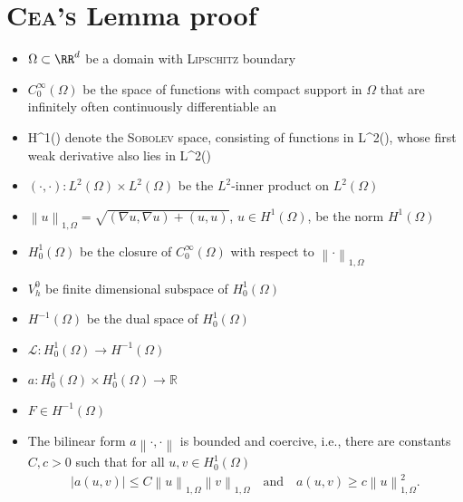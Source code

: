 \section{\textsc{Cea's} Lemma proof}
%
\newtheorem{theorem}{Theorem}
%

%
\begin{itemize}
    \item \(\Omega \subset \RR^d\) be a domain with \textsc{Lipschitz} boundary
    \item \(C^\infty_0(\Omega)\) be the space of functions with compact support in \(\Omega\) that are infinitely often continuously differentiable an
    \item H^1(\Omega) denote the \textsc{Sobolev} space, consisting of functions in L^2(\Omega), whose first weak derivative also lies in L^2(\Omega)
    \item \(\left(\cdot, \cdot \right): L^2(\Omega) \times L^2(\Omega)\) be the \(L^2\)-inner product on \(L^2(\Omega)\)
    \item \(\left\|u\right\|_{1,\Omega} = \sqrt{\left(\nabla u, \nabla u\right) + \left(u, u\right)}\), \(u \in H^1(\Omega)\), be the norm \(H^1(\Omega)\)
    \item \(H^1_0(\Omega)\) be the closure of \(C^\infty_0(\Omega)\) with respect to \(\left\| \cdot \right\|_{1,\Omega}\)
    \item \(V^0_h\) be finite dimensional subspace of \(H^1_0(\Omega)\)
    \item \(H^{-1}(\Omega)\) be the dual space of \(H^1_0(\Omega)\)
    \item \(\mathcal{L}: H^1_0(\Omega) \to H^{-1}(\Omega)\)
    \item \(a: H^1_0(\Omega) \times H^1_0(\Omega) \to \mathbb{R}\)
    \item \(F \in H^{-1}(\Omega)\)
\end{itemize}
%

%
\begin{itemize}
    \item The bilinear form \(a\left\|\cdot, \cdot\right\|\) is bounded and coercive, i.e., there are constants \(C, c > 0\) such that for all \(u, v \in H^1_0(\Omega)\)
    \begin{gather*}
        \left|a\left(u, v\right)\right| \leq C \left\| u \right\|_{1,\Omega} \left\| v \right\|_{1,\Omega} \quad \text{and} \quad 
            a\left(u, v\right) \geq c \left\| u \right\|_{1,\Omega}^2.
    \end{gather*}
\end{itemize}
%

